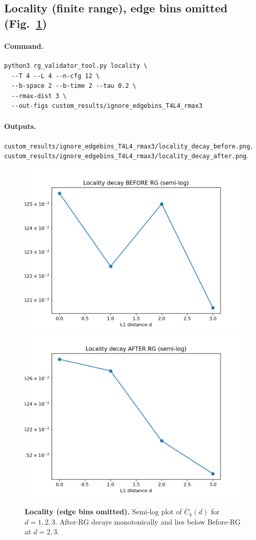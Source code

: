 \documentclass[11pt]{article}
\begin{document}
\subsection{Locality (finite range), edge bins omitted (Fig.~\ref{fig:locality-ignored-edgebins})}

\paragraph{Command.}
\begin{Verbatim}[fontsize=\small]
python3 rg_validator_tool.py locality \
  --T 4 --L 4 --n-cfg 12 \
  --b-space 2 --b-time 2 --tau 0.2 \
  --rmax-dist 3 \
  --out-figs custom_results/ignore_edgebins_T4L4_rmax3
\end{Verbatim}

\paragraph{Outputs.}
\texttt{custom\_results/ignore\_edgebins\_T4L4\_rmax3/locality\_decay\_before.png},\\
\texttt{custom\_results/ignore\_edgebins\_T4L4\_rmax3/locality\_decay\_after.png}.

\begin{figure}[t]
  \centering
  \includegraphics[width=.48\linewidth]{custom_results/ignore_edgebins_T4L4_rmax3/locality_decay_before.png}\hfill
  \includegraphics[width=.48\linewidth]{custom_results/ignore_edgebins_T4L4_rmax3/locality_decay_after.png}
  \caption{\textbf{Locality (edge bins omitted).} Semi-log plot of $\overline{C}_k(d)$ for $d=1,2,3$. After-RG decays monotonically and lies below Before-RG at $d=2,3$.}
  \label{fig:locality-ignored-edgebins}
\end{figure}
\end{document}

